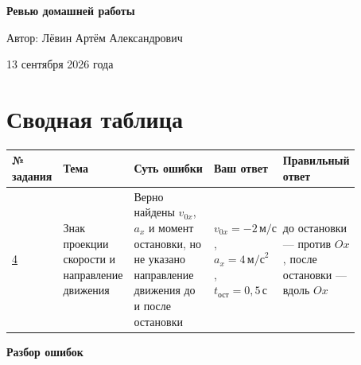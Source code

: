\documentclass[12pt,a4paper]{article}
\begin{document}
\begin{titlepage}
\centering
\vspace*{\fill}

{\LARGE\bfseries Ревью домашней работы\par}

\vspace{1.2cm}

{\large Автор: Лёвин Артём Александрович\par}

\vspace{0.6cm}

{\large 13 сентября 2026 года\par}

\vspace*{\fill}


\end{titlepage}

\newpage

\section*{Сводная таблица}

{\small
\begin{center}
\begin{tabular}{p{0.11\linewidth} p{0.18\linewidth} p{0.27\linewidth} p{0.15\linewidth} p{0.16\linewidth}}
\toprule
\textbf{№ задания} & \textbf{Тема} & \textbf{Суть ошибки} & \textbf{Ваш ответ} & \textbf{Правильный ответ} \\
\midrule
\hyperref[task:4]{4} &
Знак проекции скорости и направление движения &
Верно найдены $v_{0x}$, $a_x$ и момент остановки, но не указано направление движения до и после остановки &
$v_{0x}=-2\,\text{м/с}$, $a_x=4\,\text{м/с}^2$, $t_{\text{ост}}=0{,}5\,\text{с}$ &
до остановки --- против $Ox$, после остановки --- вдоль $Ox$ \\
\bottomrule
\end{tabular}
\end{center}
}

\newpage
\vspace*{\fill}
\begin{center}
{\LARGE\bfseries Разбор ошибок}
\end{center}
\vspace*{\fill}
\newpage
\end{document}
